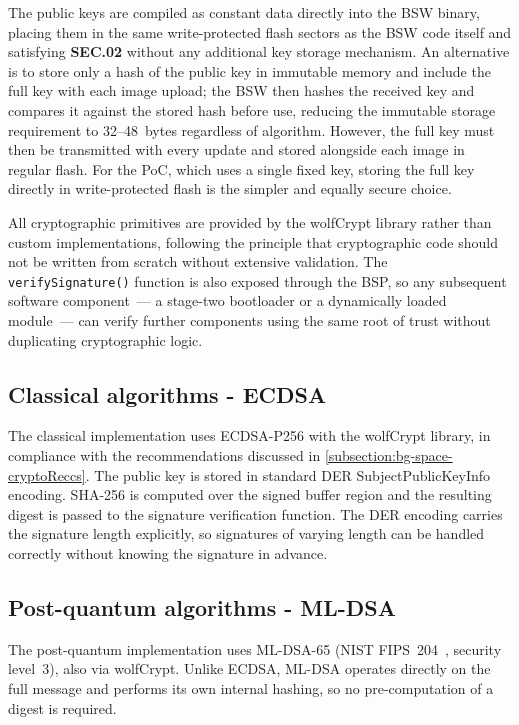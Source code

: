 The public keys are compiled as constant data directly into the BSW binary, placing them in the same write-protected flash sectors as the BSW code itself and satisfying \textbf{SEC.02} without any additional key storage mechanism. An alternative is to store only a hash of the public key in immutable memory and include the full key with each image upload; the BSW then hashes the received key and compares it against the stored hash before use, reducing the immutable storage requirement to 32--48~bytes regardless of algorithm. However, the full key must then be transmitted with every update and stored alongside each image in regular flash. For the PoC, which uses a single fixed key, storing the full key directly in write-protected flash is the simpler and equally secure choice.

All cryptographic primitives are provided by the wolfCrypt library rather than custom implementations, following the principle that cryptographic code should not be written from scratch without extensive validation. The \texttt{verifySignature()} function is also exposed through the BSP, so any subsequent software component~--- a stage-two bootloader or a dynamically loaded module~--- can verify further components using the same root of trust without duplicating cryptographic logic.

\subsection{Classical algorithms - ECDSA}
The classical implementation uses ECDSA-P256 with the wolfCrypt library, in compliance with the recommendations discussed in \autoref{subsection:bg-space-cryptoReccs}. The public key is stored in standard DER SubjectPublicKeyInfo encoding. SHA-256 is computed over the signed buffer region and the resulting digest is passed to the signature verification function. The DER encoding carries the signature length explicitly, so signatures of varying length can be handled correctly without knowing the signature in advance.

\subsection{Post-quantum algorithms - ML-DSA}

The post-quantum implementation uses ML-DSA-65 (NIST FIPS~204~\cite{nist_ml_dsa}, security level~3), also via wolfCrypt. Unlike ECDSA, ML-DSA operates directly on the full message and performs its own internal hashing, so no pre-computation of a digest is required.

